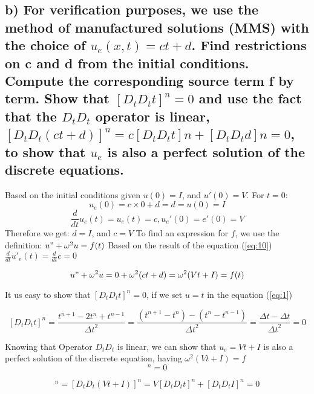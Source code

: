 \documentclass{article}
\begin{document}
    \newpage
    \subsection*{b) For verification purposes, we use the method of manufactured solutions (MMS) with the choice of $u_e(x,t)=ct+d$. Find restrictions on c and d from the initial conditions. Compute the corresponding source term f by term. Show that $[D_t D_t t]^n=0$ and use the fact that the $D_t D_t$ operator is linear, $[D_t D_t(ct + d)]^n = c[D_t D_t t]n+[D_t D_t d]n = 0$, to show that $u_e$ is also a perfect solution of the discrete equations.}
    
    Based on the initial conditions given $u(0) = I$, and $u'(0) = V$.
    For $t = 0$:
    \begin{equation}
        u_e(0) = c\times0 + d =  d = u(0) = I
    \end{equation}
    \begin{equation}\label{eq:10}
        \frac{d}{dt}u_e(t) = u_e(t) = c, u_e'(0) = e'(0) = V 
    \end{equation}
    Therefore we get:  $d = I$, and $c = V$
    To find an expression for $f$, we use the definition: $u" + \omega^2 u = f(t)$
    \newline
    Based on the result of the equation (\ref{eq:10})$\frac{d}{dt}u'_e(t) = \frac{d}{dt}c = 0$
    
    \begin{equation}
        u" + \omega^2 u = 0 + \omega^2 (ct + d) = \omega^2 (Vt + I) = f(t) 
    \end{equation}
    
    It us easy to show that $[D_t D_t t]^n = 0$, if we set $u = t$ in the equation (\ref{eq:1})
    
    \begin{equation}
            {[D_t D_t t]}^n = \frac{t^{n+1} - 2t^n + t^{n-1}}{{\Delta t}^2} = \frac{(t^{n+1} - t^n) - (t^n - t^{n-1})}{{\Delta t}^2} = \frac{\Delta t - \Delta t}{{\Delta t}^2} = 0
    \end{equation}
    
    Knowing that Operator $D_t D_t$ is linear, we can show that $u_e = Vt + I$ is also a perfect solution of the discrete equation, having $\omega^2 (Vt + I) = f$
    \begin{equation}
        [D_t D_t u + \omega^2u -f]^n = 0
    \end{equation}
    
    \begin{equation}
        [D_t D_t (Vt + I) + \omega^2 (Vt + I) - \omega^2 (Vt + I)]^n = [D_t D_t (Vt + I)]^n = V[D_t D_t t]^n + [D_t D_t I]^n = 0
    \end{equation}
    
\end{document}
